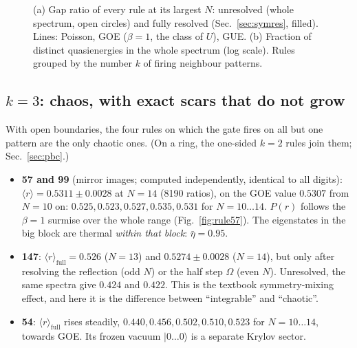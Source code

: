 \begin{table}[t]
\centering
\scriptsize
{}
\caption{Per-rule summary at each rule's largest computed $N$ (obc0, gate $H$), generated by
. sym.: spatial symmetry resolved ($R$ for odd $N$; the half-step $\Omega$ for even $N$).
sectors/blocks: Krylov sectors, and fully resolved gate-algebra blocks. $\langle r\rangle_\mathrm{none}$: whole spectrum as one
list. $\langle r\rangle_\mathrm{full}$: pooled over fully resolved blocks with $\ge20$ distinct half-levels, from \#$r$ ratios.
distinct $\theta/2^N$: number of distinct quasienergies over the whole spectrum. $\bar\eta_\mathrm{big}$: mean
$S_2/S_2^\mathrm{rand}(\mathrm{block})$ in the largest block. singlets: one-dimensional gate-algebra blocks inside Krylov
sectors of dimension $\ge3$, i.e.\ exact eigenstates of every individual gate.}
\label{tab:summary}
\end{table}

\begin{figure}[t]
\centering
{}
\caption{(a) Gap ratio of every rule at its largest $N$: unresolved (whole spectrum, open circles) and fully resolved
(Sec.~\ref{sec:symres}, filled). Lines: Poisson, GOE ($\beta=1$, the class of $U$), GUE. (b) Fraction of distinct
quasienergies in the whole spectrum (log scale). Rules grouped by the number $k$ of firing neighbour patterns.}
\label{fig:overview}
\end{figure}

\subsection{$k=3$: chaos, with exact scars that do not grow}
With open boundaries, the four rules on which the gate fires on all but one pattern are the only chaotic ones. (On a
ring, the one-sided $k=2$ rules join them; Sec.~\ref{sec:pbc}.)
\begin{itemize}
\item \textbf{57 and 99} (mirror images; computed independently, identical to all digits): $\langle r\rangle=0.5311\pm0.0028$
  at $N=14$ (8190 ratios), on the GOE value $0.5307$ from $N=10$ on: $0.525, 0.523, 0.527, 0.535, 0.531$ for
  $N=10\ldots14$. $P(r)$ follows the $\beta=1$
  surmise over the whole range (Fig.~\ref{fig:rule57}). The eigenstates in the big block are thermal \emph{within that
  block}: $\bar\eta=0.95$.
\item \textbf{147}: $\langle r\rangle_\mathrm{full}=0.526$ ($N=13$) and $0.5274\pm0.0028$ ($N=14$), but only after resolving
  the reflection (odd $N$) or the half step $\Omega$ (even $N$). Unresolved, the same spectra give $0.424$ and $0.422$. This is the textbook symmetry-mixing effect,
  and here it is the difference between ``integrable'' and ``chaotic''.
\item \textbf{54}: $\langle r\rangle_\mathrm{full}$ rises steadily, $0.440, 0.456, 0.502, 0.510, 0.523$ for
  $N=10\ldots14$, towards GOE. Its frozen vacuum $|0\ldots0\rangle$ is a separate Krylov sector.
\end{itemize}

